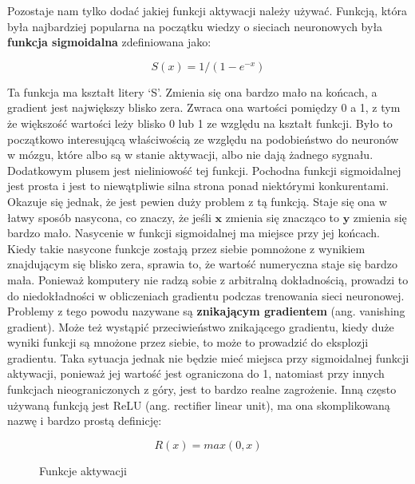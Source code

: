 \noindent Pozostaje nam tylko dodać jakiej funkcji aktywacji należy używać. Funkcją, która była najbardziej popularna na początku wiedzy o sieciach neuronowych była \textbf{funkcja sigmoidalna} zdefiniowana jako:

\begin{equation}
S(x) = 1 / (1 - e^{-x})
\end{equation}

Ta funkcja ma kształt litery ‘S’. Zmienia się ona bardzo mało na końcach, a gradient jest największy blisko zera. Zwraca ona wartości pomiędzy 0 a 1, z tym że większość wartości leży blisko 0 lub 1 ze względu na kształt funkcji. Było to początkowo interesującą właściwością ze względu na podobieństwo do neuronów w mózgu, które albo są w stanie aktywacji, albo nie dają żadnego sygnału. Dodatkowym plusem jest nieliniowość tej funkcji. Pochodna funkcji sigmoidalnej jest prosta i jest to niewątpliwie silna strona ponad niektórymi konkurentami. Okazuje się jednak, że jest pewien duży problem z tą funkcją. Staje się ona w łatwy sposób nasycona, co znaczy, że jeśli $\boldsymbol{x}$ zmienia się znacząco to $\boldsymbol{y}$ zmienia się bardzo mało. Nasycenie w funkcji sigmoidalnej ma miejsce przy jej końcach. Kiedy takie nasycone funkcje zostają przez siebie pomnożone z wynikiem znajdującym się blisko zera, sprawia to, że wartość numeryczna staje się bardzo mała. Ponieważ komputery nie radzą sobie z arbitralną dokładnością, prowadzi to do niedokładności w obliczeniach gradientu podczas trenowania sieci neuronowej. Problemy z tego powodu nazywane są \textbf{znikającym gradientem} (ang. vanishing gradient). Może też wystąpić przeciwieństwo znikającego gradientu, kiedy duże wyniki funkcji są mnożone przez siebie, to może to prowadzić do eksplozji gradientu. Taka sytuacja jednak nie będzie mieć miejsca przy sigmoidalnej funkcji aktywacji, ponieważ jej wartość jest ograniczona do 1, natomiast przy innych funkcjach nieograniczonych z góry, jest to bardzo realne zagrożenie. Inną często używaną funkcją jest ReLU (ang. rectifier linear unit), ma ona skomplikowaną nazwę i bardzo prostą definicję:

\begin{equation}
R(x) = max(0, x)
\end{equation}

\clearpage
\begin{figure}[H]
\centering

\caption{Funkcje aktywacji}
\end{figure}
\clearpage

